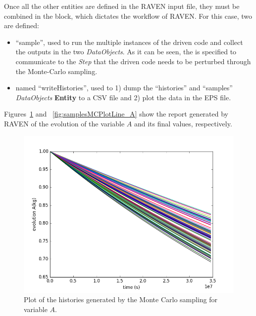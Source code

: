 Once all the other entities are defined in the RAVEN input file, they must be combined in the  block,
which dictates the workflow of RAVEN.  For this case, two  are defined:
\begin{itemize}
  \item {} ``sample'', used to run the multiple instances of the driven code and  collect the outputs
    in the two \textit{DataObjects}. As it can be seen, the  is specified to communicate to the
    \textit{Step} that the driven code needs to be perturbed through the Monte-Carlo sampling.
  \item  {} named ``writeHistories'', used to 1) dump the ``histories'' and ``samples'' \textit{DataObjects}
    \textbf{Entity} to a CSV file and 2) plot the data in the EPS file.
\end{itemize}

Figures~\ref{fig:historiesMCPlotLine_A} and ~\ref{fig:samplesMCPlotLine_A} show the report generated by RAVEN of the
evolution of the variable $A$ and its final values, respectively.
\begin{figure}[h!]
  \centering
  \includegraphics[scale=0.7]{../../tests/framework/user_guide/ravenTutorial/gold/MonteCarlo/1-history_A_line.png}
  \caption{Plot of the histories generated by the Monte Carlo sampling for variable $A$.}
  \label{fig:historiesMCPlotLine_A}
\end{figure}
 
